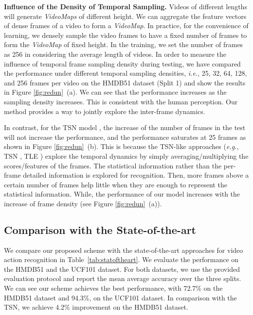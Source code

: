 \documentclass[english, 10pt, twocolumn, twoside]{IEEEtran}
\begin{document}
\noindent\textbf{Influence of the Density of Temporal Sampling.} Videos of different lengths will generate \emph{VideoMaps} of different height. We can aggregate the feature vectors of dense frames of a video to form a \emph{VideoMap}. In practice, for the convenience of learning, we densely sample the video frames to have a fixed number of frames to form the \emph{VideoMap} of fixed height. In the training, we set the number of frames as 256 in considering the average length of videos. In order to measure the influence of temporal frame sampling density during testing, we have compared the performance under different temporal sampling densities, \emph{i.e.}, 25, 32, 64, 128, and 256 frames per video on the HMDB51 dataset (Split 1) and show the results in Figure \ref{fig:redun}~(a). We can see that the performance increases as the sampling density increases. This is consistent with the human perception. Our method provides a way to jointly explore the inter-frame dynamics.





In contrast, for the TSN model \cite{wang2016temporal}, the increase of the number of frames in the test will not increase the performance,  and the performance saturates at 25 frames as shown in Figure \ref{fig:redun}~(b). This is because the TSN-like approaches (\emph{e.g.}, TSN \cite{wang2016temporal}, TLE \cite{diba2017deeptemporal}) explore the temporal dynamics by simply averaging/multiplying the scores/features of the frames. The statistical information rather than the per-frame detailed information is explored for recognition. Then, more frames above a certain number of frames help little when they are enough to represent the statistical information. While, the performance of our model increases with the increase of frame density (see Figure \ref{fig:redun}~(a)).

\subsection{Comparison with the State-of-the-art }
We compare our proposed scheme with the state-of-the-art approaches for video action recognition in Table~\ref{tab:statoftheart}. We evaluate the performance on the HMDB51 and the UCF101 dataset. For both datasets, we use the provided evaluation protocol and report the mean average accuracy over the three splits. We can see our scheme achieves the best performance, with 72.7\% on the HMDB51 dataset and 94.3\%, on the UCF101 dataset. In comparison with the TSN, we achieve 4.2\% improvement on the HMDB51 dataset.
\end{document}
